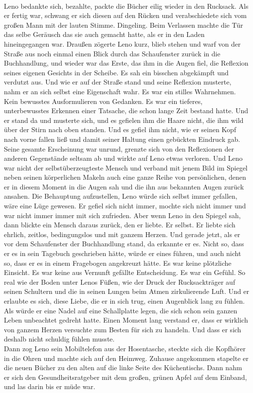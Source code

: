 \documentclass[ngerman,smalldemyvopaper,11pt,oneside,onecolumn,openright,extrafontsizes]{memoir}
\begin{document}
\vspace{0.5em} \\
Leno bedankte sich, bezahlte, packte die Bücher eilig wieder in den Rucksack. Als er fertig war, schwang er sich diesen auf den Rücken und verabschiedete sich vom großen Mann mit der lauten Stimme. Dingeling. Beim Verlassen machte die Tür das selbe Geräusch das sie auch gemacht hatte, als er in den Laden hineingegangen war. Draußen zögerte Leno kurz, blieb stehen und warf von der Straße aus noch einmal einen Blick durch das Schaufenster zurück in die Buchhandlung, und wieder war das Erste, das ihm in die Augen fiel, die Reflexion seines eigenen Gesichts in der Scheibe. Es sah ein bisschen abgekämpft und verdutzt aus.
Und wie er auf der Straße stand und seine Reflexion musterte, nahm er an sich selbst eine Eigenschaft wahr. Es war ein stilles Wahrnehmen. Kein bewusstes Ausformulieren von Gedanken. Es war ein tieferes, unterbewusstes Erkennen einer Tatsache, die schon lange Zeit bestand hatte. Und er stand da und musterte sich, und es gefielen ihm die Haare nicht, die ihm wild über der Stirn nach oben standen. Und es gefiel ihm nicht, wie er seinen Kopf nach vorne fallen ließ und damit seiner Haltung einen gebückten Eindruck gab. Seine gesamte Erscheinung war unrund, grenzte sich von den Reflexionen der anderen Gegenstände seltsam ab und wirkte auf Leno etwas verloren. Und Leno war nicht der selbstüberzeugteste Mensch und verband mit jenem Bild im Spiegel neben seinen körperlichen Makeln auch eine ganze Reihe von persönlichen, denen er in diesem Moment in die Augen sah und die ihn aus bekannten Augen zurück ansahen. Die Behauptung aufzustellen, Leno würde sich selbst immer gefallen, wäre eine Lüge gewesen. Er gefiel sich nicht immer, mochte sich nicht immer und war nicht immer immer mit sich zufrieden. Aber wenn Leno in den Spiegel sah, dann blickte ein Mensch daraus zurück, den er liebte. Er selbst. Er liebte sich ehrlich, zeitlos, bedingungslos und mit ganzem Herzen. Und gerade jetzt, als er vor dem Schaufenster der Buchhandlung stand, da erkannte er es. Nicht so, dass er es in sein Tagebuch geschrieben hätte, würde er eines führen, und auch nicht so, dass er es in einem Fragebogen angekreuzt hätte. Es war keine plötzliche Einsicht. Es war keine aus Vernunft gefällte Entscheidung. Es war ein Gefühl. So real wie der Boden unter Lenos Füßen, wie der Druck der Rucksackträger auf seinen Schultern und die in seinen Lungen beim Atmen zirkulierende Luft. Und er erlaubte es sich, diese Liebe, die er in sich trug, einen Augenblick lang zu fühlen. Als würde er eine Nadel auf eine Schallplatte legen, die sich schon sein ganzen Leben unbeachtet gedreht hatte. Einen Moment lang verstand er, dass er wirklich von ganzem Herzen versuchte zum Besten für sich zu handeln. Und dass er sich deshalb nicht schuldig fühlen musste.\\
Dann zog Leno sein Mobiltelefon aus der Hosentasche, steckte sich die Kopfhörer in die Ohren und machte sich auf den Heimweg. Zuhause angekommen stapelte er die neuen Bücher zu den alten auf die linke Seite des Küchentischs. Dann nahm er sich den Gesundheitsratgeber mit dem großen, grünen Apfel auf dem Einband, und las darin bis er müde war.
\end{document}
